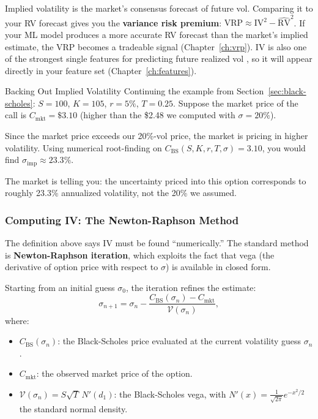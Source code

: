 \begin{projectconnection}
Implied volatility is the market's consensus forecast of future vol.
Comparing it to your RV forecast gives you the \textbf{variance risk premium}: $\text{VRP} \approx \text{IV}^2 - \widehat{\text{RV}}^2$.
If your ML model produces a more accurate RV forecast than the market's implied estimate, the VRP becomes a tradeable signal (Chapter~\ref{ch:vrp}).
IV is also one of the strongest single features for predicting future realized vol \citep{Gu2020}, so it will appear directly in your feature set (Chapter~\ref{ch:features}).
\end{projectconnection}

\begin{workedexample}{Backing Out Implied Volatility}
Continuing the example from Section~\ref{sec:black-scholes}: $S = 100$, $K = 105$, $r = 5\%$, $T = 0.25$.
Suppose the market price of the call is $C_{\text{mkt}} = \$3.10$ (higher than the \$2.48 we computed with $\sigma = 20\%$).

Since the market price exceeds our 20\%-vol price, the market is pricing in higher volatility.
Using numerical root-finding on $C_{\text{BS}}(S, K, r, T, \sigma) = 3.10$, you would find $\sigma_{\text{imp}} \approx 23.3\%$.

The market is telling you: the uncertainty priced into this option corresponds to roughly 23.3\% annualized volatility, not the 20\% we assumed.
\end{workedexample}

\subsubsection*{Computing IV: The Newton-Raphson Method}

The definition above says IV must be found ``numerically.''
The standard method is \textbf{Newton-Raphson iteration}, which exploits the fact that vega (the derivative of option price with respect to $\sigma$) is available in closed form.

Starting from an initial guess $\sigma_0$, the iteration refines the estimate:
\begin{equation}\label{eq:newton-raphson-iv}
\sigma_{n+1} = \sigma_n - \frac{C_{\text{BS}}(\sigma_n) - C_{\text{mkt}}}{\mathcal{V}(\sigma_n)},
\end{equation}
where:
\begin{itemize}[nosep]
  \item $C_{\text{BS}}(\sigma_n)$: the Black-Scholes price evaluated at the current volatility guess $\sigma_n$.
  \item $C_{\text{mkt}}$: the observed market price of the option.
  \item $\mathcal{V}(\sigma_n) = S\sqrt{T}\,N'(d_1)$: the Black-Scholes vega, with $N'(x) = \frac{1}{\sqrt{2\pi}}e^{-x^2/2}$ the standard normal density.
\end{itemize}

